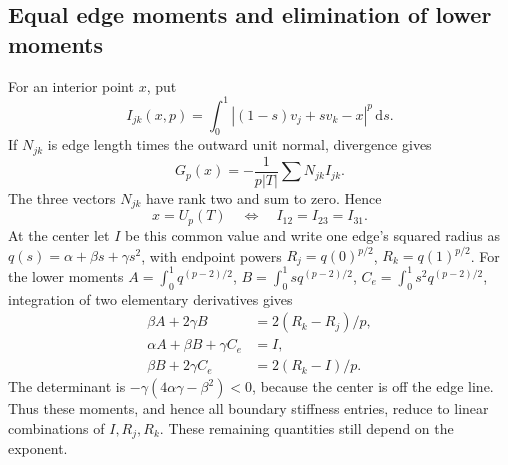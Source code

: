 \documentclass[11pt]{article}
\theoremstyle{definition}
\newcommand{\dd}{\,\mathrm d}
\begin{document}
\subsection{Equal edge moments and elimination of lower moments}
For an interior point $x$, put
\[
 I_{jk}(x,p)=\int_0^1|(1-s)v_j+sv_k-x|^p\dd s.
\]
If $N_{jk}$ is edge length times the outward unit normal, divergence gives
\[
 G_p(x)=-\frac1{p|T|}\sum N_{jk}I_{jk}.
\]
The three vectors $N_{jk}$ have
rank two and sum to zero. Hence
\begin{equation}\label{eq:equaledges}
 x=U_p(T)\quad\Longleftrightarrow\quad I_{12}=I_{23}=I_{31}.
\end{equation}
At the center let $I$ be this common value and write one edge's squared
radius as $q(s)=\alpha+\beta s+\gamma s^2$, with endpoint powers
$R_j=q(0)^{p/2}$, $R_k=q(1)^{p/2}$. For the lower moments
$A=\int_0^1q^{(p-2)/2}$, $B=\int_0^1s q^{(p-2)/2}$,
$C_e=\int_0^1s^2q^{(p-2)/2}$, integration of two elementary derivatives
gives
\[
 \begin{aligned}
 \beta A+2\gamma B&=2(R_k-R_j)/p,\\
 \alpha A+\beta B+\gamma C_e&=I,\\
 \beta B+2\gamma C_e&=2(R_k-I)/p.
 \end{aligned}
\]
The determinant is $-\gamma(4\alpha\gamma-\beta^2)<0$, because the center
is off the edge line. Thus these moments, and hence all boundary stiffness
entries, reduce to linear combinations of $I,R_j,R_k$. These remaining
quantities still depend on the exponent.
\end{document}
